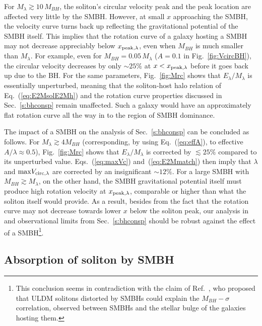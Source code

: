 \documentclass[aps,prd,floats,superscriptaddress,showpacs,nofootinbib,twocolumn,preprintnumbers]{revtex4-1}%
\begin{document}
\begin{appendix}
For $M_\lambda\gtrsim10\,M_{BH}$, the soliton's circular velocity peak and the peak location are affected very little by the SMBH. However, at small $x$ approaching the SMBH, the velocity curve turns back up  reflecting the gravitational potential of the SMBH itself. This implies that the rotation curve of a galaxy hosting a SMBH may not decrease appreciably below $x_{\rm peak,\lambda}$, even when $M_{BH}$ is much smaller than $M_\lambda$. For example, even for $M_{BH}=0.05\,M_\lambda$ ($A=0.1$ in Fig.~\ref{fig:VcircBH}), the circular velocity decreases by only $\sim25\%$ at $x<x_{\rm peak,\lambda}$ before it goes back up due to the BH. For the same parameters, Fig.~\ref{fig:Mrc} shows that $E_\lambda/M_\lambda$ is essentially unperturbed, meaning that the soliton-host halo relation of Eq.~(\ref{eq:E2MsolE2Mh}) and the rotation curve properties discussed in Sec.~\ref{s:bhconsp} remain unaffected. Such a galaxy would have an approximately flat rotation curve all the way in to the region of SMBH dominance.

The impact of a SMBH on the analysis of Sec.~\ref{s:bhconsp} can be
concluded as follows. For $M_\lambda\gtrsim4M_{BH}$ (corresponding, by
using Eq.~(\ref{eq:effA}), to effective $A/\lambda\approx0.5$),
Fig.~\ref{fig:Mrc} shows that $E_\lambda/M_\lambda$ is corrected by
$\lesssim25\%$ compared to its unperturbed
value. Eqs.~(\ref{eq:maxVc}) and~(\ref{eq:E2Mmatch}) then imply that
$\lambda$ and ${\rm max}V_{\rm circ,\lambda}$ are corrected by an
insignificant $\sim12\%$.  For a large SMBH with $M_{BH}\gtrsim
M_\lambda$, on the other hand, the SMBH gravitational potential itself
must produce high rotation velocity at $x_{\rm peak,\lambda}$,
comparable or higher than what the soliton itself would provide. As a
result, besides from the fact that the rotation curve may not decrease
towards lower $x$ below the soliton peak, our analysis in and
observational limits from Sec.~\ref{s:bhconsp} should be robust
against the effect of a SMBH\footnote{This conclusion seems in
  contradiction with the claim of Ref.~\cite{Lee:2015yws}, who
  proposed that ULDM solitons distorted by SMBHs could explain the
  $M_{BH}-\sigma$ correlation, observed between SMBHs and the stellar
  bulge of the galaxies hosting them.}. 

\subsection{Absorption of soliton by SMBH}\label{ss:absorption}


\end{appendix}
\end{document}

